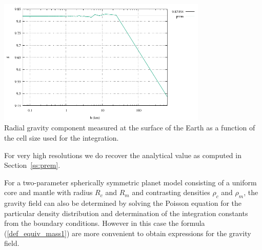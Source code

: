 \begin{center}
\includegraphics[width=10cm]{images/prem/g.pdf}\\
{\captionfont Radial gravity component measured at the surface
of the Earth as a function of the cell size used for the integration.}
\end{center}

For very high resolutions we do recover the analytical value as
computed in Section~\ref{ss:prem}.



\vspace{0.5cm}

\vspace{0.5cm}

For a two-parameter spherically symmetric planet model consisting of 
a uniform core and mantle with radius $R_c$ and $R_m$ 
and contrasting densities $\rho_c$ and $\rho_m$,
the gravity field can also be determined by solving the
Poisson equation for the particular density distribution and 
determination of the integration constants from the boundary conditions.
However in this case the formula (\ref{def_equiv_mass1}) are more
convenient to obtain expressions for the gravity field.

